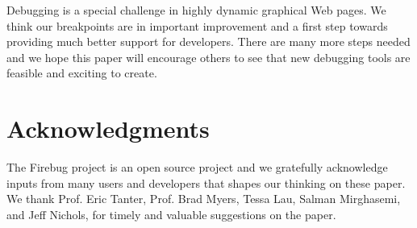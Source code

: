 \documentclass{www2010-accepted}
\begin{document}
Debugging is a special challenge in highly dynamic graphical Web pages.
We think our breakpoints are in important improvement and a first step towards
providing much better support for developers. There are many more steps needed
and we hope this paper will encourage others to see that new debugging tools are
feasible and exciting to create.


\section{Acknowledgments}
The Firebug project is an open source project and we gratefully
acknowledge inputs from many users and developers that shapes our
thinking on these paper. We thank Prof. Eric Tanter, Prof. Brad Myers,
Tessa Lau, Salman Mirghasemi, and Jeff Nichols, for timely and
valuable suggestions on the paper.




\end{document}
